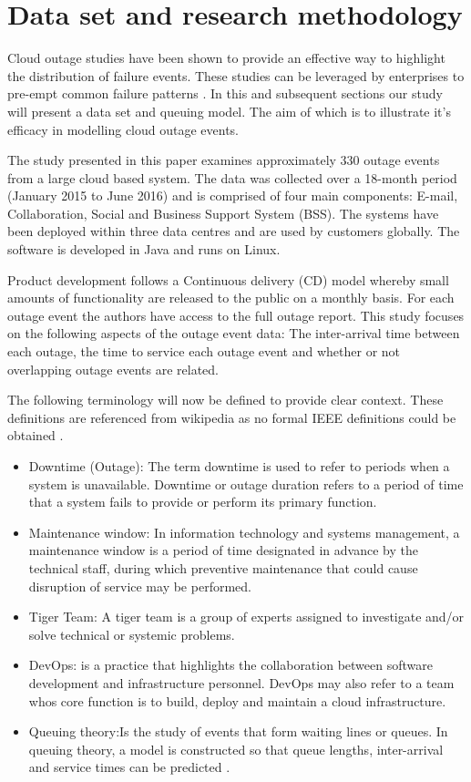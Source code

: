 \documentclass[5p]{elsarticle}
\begin{document}
\section{Data set and research methodology}

Cloud outage studies have been shown to provide an effective way to highlight the distribution of failure events. These studies can be leveraged by enterprises to pre-empt common failure patterns \cite{InfoWorld2015outage}. In this and subsequent sections our study will present a data set and queuing model. The aim of which is to illustrate it's efficacy in modelling cloud outage events.  

The study presented in this paper examines approximately 330 outage events from a large cloud based system. The data was collected over a 18-month period (January 2015 to June 2016) and is comprised of four main components: E-mail, Collaboration, Social and Business Support System (BSS). The systems have been deployed within three data centres and are used by customers globally. The software is developed in Java and runs on Linux.

Product development follows a Continuous delivery (CD) model whereby small amounts of functionality are released to the public on a monthly basis. For each outage event the authors have access to the full outage report. This study focuses on the following aspects of the outage event data: The inter-arrival time between each outage, the time to service each outage event and whether or not overlapping outage events are related.

The following terminology will now be defined to provide clear context. These definitions are referenced from wikipedia as no formal IEEE definitions could be obtained \cite{wikidef}.

\begin{itemize}
 \item Downtime (Outage): The term downtime is used to refer to periods when a system is unavailable. Downtime or outage duration refers to a period of time that a system fails to provide or perform its primary function. 
 \item  Maintenance window: In information technology and systems management, a maintenance window is a period of time designated in advance by the technical staff, during which preventive maintenance that could cause disruption of service may be performed.
 \item Tiger Team: A tiger team is a group of experts assigned to investigate and/or solve technical or systemic problems. 
 \item DevOps: is a practice that highlights the collaboration between software development and infrastructure personnel. DevOps may also refer to a team whos core function is to build, deploy and maintain a cloud infrastructure. 
 \item Queuing theory:Is the study of events that form waiting lines or queues. In queuing theory, a model is constructed so that queue lengths, inter-arrival and service times can be predicted \cite{sundarapandian2009probability}.
\end{itemize}
\end{document}
